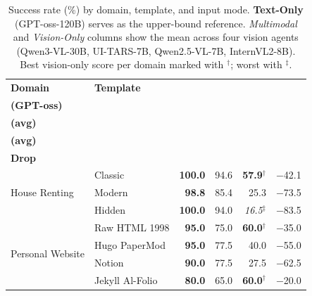 \documentclass[10pt]{article}
\newcommand{\tmo}[1]{\textbf{#1}}   %
\begin{document}
\begin{table}[ht]
\centering
\caption{%
  Success rate (\%) by domain, template, and input mode.
  \textbf{Text-Only} (GPT-oss-120B) serves as the upper-bound reference.
  \textit{Multimodal} and \textit{Vision-Only} columns show the mean across
  four vision agents (Qwen3-VL-30B, UI-TARS-7B, Qwen2.5-VL-7B, InternVL2-8B).
  Best vision-only score per domain marked with $^\dagger$;
  worst with $^\ddagger$.
}
\label{tab:success-rate}
\renewcommand{\arraystretch}{1.20}
\setlength{\tabcolsep}{7pt}

\begin{tabular}{l l r r r r}
\toprule
\textbf{Domain} & \textbf{Template} &
\makecell{\textbf{Text-Only}\\\textbf{(GPT-oss)}} &
\makecell{\textbf{Multimodal}\\\textbf{(avg)}} &
\makecell{\textbf{Vision-Only}\\\textbf{(avg)}} &
\makecell{\textbf{Vision-Only}\\\textbf{Drop}} \\
\midrule


\multirow{3}{*}{House Renting}
  & Classic  & \tmo{100.0} & 94.6 & \textbf{57.9}$^\dagger$  & $-$42.1 \\
  & Modern   & \tmo{98.8}  & 85.4 & 25.3                     & $-$73.5 \\
  & Hidden   & \tmo{100.0} & 94.0 & \textit{16.5}$^\ddagger$ & $-$83.5 \\

\midrule

\multirow{4}{*}{Personal Website}
  & Raw HTML 1998   & \tmo{95.0} & 75.0 & \textbf{60.0}$^\dagger$  & $-$35.0 \\
  & Hugo PaperMod   & \tmo{95.0} & 77.5 & 40.0                     & $-$55.0 \\
  & Notion          & \tmo{90.0} & 77.5 & 27.5                     & $-$62.5 \\
  & Jekyll Al-Folio & \tmo{80.0} & 65.0 & \textbf{60.0}$^\dagger$  & $-$20.0 \\

\midrule


\end{tabular}
\end{table}
\end{document}
